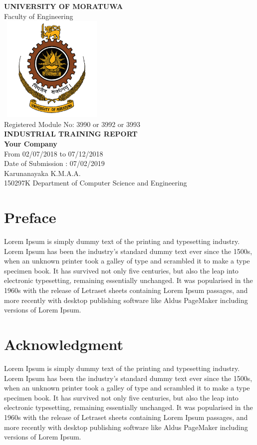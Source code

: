 \documentclass[12pt,a4paper]{report}
\begin{document}
\begin{titlepage}
\begin{center}
{\LARGE\textbf{{UNIVERSITY OF   MORATUWA}}\\[1cm]}
{{\LARGE Faculty of Engineering}}\\[2.25cm]
\includegraphics[width=2in, height=2in]{UOM.png}\\[2.25cm]
{{\LARGE Registered Module No: 3990 or 3992 or 3993}}\\[.35cm]
{\Large\textbf{{INDUSTRIAL TRAINING REPORT}}\\[.5cm]}
{\Large\textbf{{Your Company}}\\[1cm]}
{{\LARGE From 02/07/2018 to 07/12/2018}}\\[1.5cm]
{{\LARGE Date of Submission : 07/02/2019}}\\[1.5cm]
{{\LARGE Karunanayaka K.M.A.A.}}\\[.35cm]
{{\LARGE 150297K Department of Computer Science and Engineering}}\\[.35cm]
\end{center}
\end{titlepage}

\section*{Preface}
Lorem Ipsum is simply dummy text of the printing and typesetting industry. Lorem Ipsum has been the industry's standard dummy text ever since the 1500s, when an unknown printer took a galley of type and scrambled it to make a type specimen book. It has survived not only five centuries, but also the leap into electronic typesetting, remaining essentially unchanged. It was popularised in the 1960s with the release of Letraset sheets containing Lorem Ipsum passages, and more recently with desktop publishing software like Aldus PageMaker including versions of Lorem Ipsum.
\newpage

\section*{Acknowledgment}
Lorem Ipsum is simply dummy text of the printing and typesetting industry. Lorem Ipsum has been the industry's standard dummy text ever since the 1500s, when an unknown printer took a galley of type and scrambled it to make a type specimen book. It has survived not only five centuries, but also the leap into electronic typesetting, remaining essentially unchanged. It was popularised in the 1960s with the release of Letraset sheets containing Lorem Ipsum passages, and more recently with desktop publishing software like Aldus PageMaker including versions of Lorem Ipsum.
\end{document}
